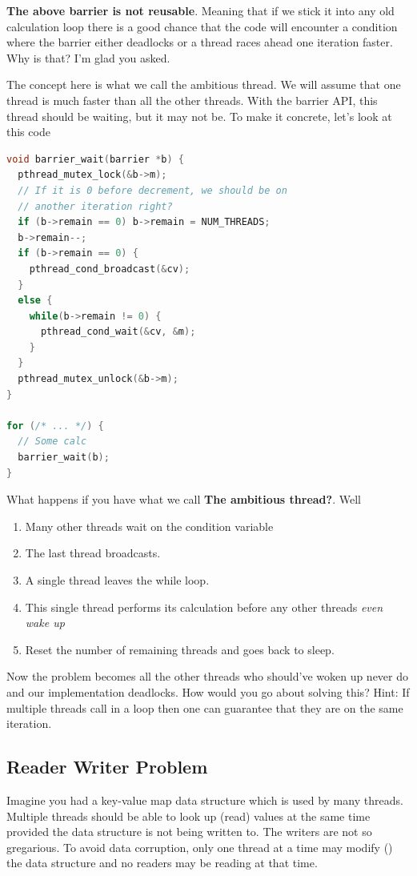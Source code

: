 \textbf{The above barrier is not reusable}.
Meaning that if we stick it into any old calculation loop there is a good chance that the code will encounter a condition where the barrier either deadlocks or a thread races ahead one iteration faster.
Why is that?
I'm glad you asked.

The concept here is what we call the ambitious thread.
We will assume that one thread is much faster than all the other threads.
With the barrier API, this thread should be waiting, but it may not be.
To make it concrete, let's look at this code

\begin{lstlisting}[language=C]
void barrier_wait(barrier *b) {
  pthread_mutex_lock(&b->m);
  // If it is 0 before decrement, we should be on
  // another iteration right?
  if (b->remain == 0) b->remain = NUM_THREADS;
  b->remain--;
  if (b->remain == 0) {
    pthread_cond_broadcast(&cv);
  }
  else {
    while(b->remain != 0) {
      pthread_cond_wait(&cv, &m);
    }
  }
  pthread_mutex_unlock(&b->m);
}

for (/* ... */) {
  // Some calc
  barrier_wait(b);
}
\end{lstlisting}

What happens if you have what we call \textbf{The ambitious thread?}. Well
\begin{enumerate}
\item Many other threads wait on the condition variable
\item The last thread broadcasts.
\item A single thread leaves the while loop.
\item This single thread performs its calculation before any other threads \textit{even wake up}
\item Reset the number of remaining threads and goes back to sleep.
\end{enumerate}

Now the problem becomes all the other threads who should've woken up never do and our implementation deadlocks.
How would you go about solving this?
Hint: If multiple threads call  in a loop then one can guarantee that they are on the same iteration.

\subsection{Reader Writer Problem}

Imagine you had a key-value map data structure which is used by many threads.
Multiple threads should be able to look up (read) values at the same time provided the data structure is not being written to.
The writers are not so gregarious.
To avoid data corruption, only one thread at a time may modify () the data structure and no readers may be reading at that time.

